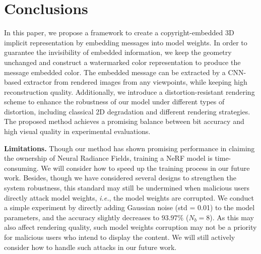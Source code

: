 \documentclass[10pt,twocolumn,letterpaper]{article}
\def\ie{{\emph{i.e.}}}
\def\ie{\emph{i.e.}}
\def\ie{{\emph{i.e.}}}
\begin{document}
\section{Conclusions}

In this paper, we propose a framework to create a copyright-embedded 3D implicit representation by embedding messages into model weights. In order to guarantee the invisibility of embedded information, we keep the geometry unchanged and construct a watermarked color representation to produce the message embedded color. The embedded message can be extracted by a CNN-based extractor from rendered images from any viewpoints, while keeping high reconstruction quality. Additionally, we introduce a distortion-resistant rendering scheme to enhance the robustness of our model under different types of distortion, including classical 2D degradation and different rendering strategies. The proposed method achieves a promising balance between bit accuracy and high visual quality in experimental evaluations.

\noindent\textbf{Limitations.} Though our method has shown promising performance in claiming the ownership of Neural Radiance Fields,  
training a NeRF model is time-consuming. We will consider how to speed up the training process in our future work. Besides, though we have considered several designs to strengthen the system robustness, this standard may still be undermined when malicious users directly attack model weights, \ie, the model weights are corrupted. We conduct a simple experiment by directly adding Gaussian noise (std = 0.01) to the model parameters, and the accuracy slightly decreases to $93.97\%$ ($N_b = 8$). As this may also affect rendering quality, such model weights corruption may not be a priority for malicious users who intend to display the content. We will still actively consider how to handle such attacks in our future work. 
 
\end{document}
